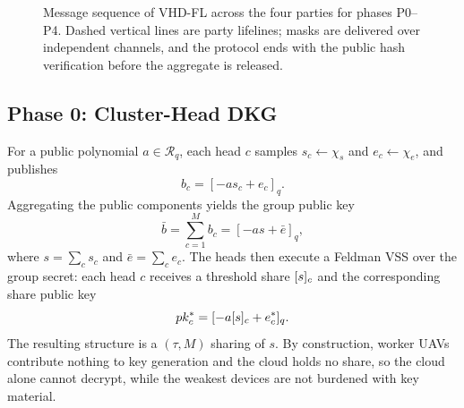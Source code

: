 \begin{figure}[t]
  \caption{Message sequence of \textsc{VHD-FL} across the four parties for phases P0--P4. Dashed vertical lines are party lifelines; masks are delivered over independent channels, and the protocol ends with the public hash verification before the aggregate is released.}
  \label{fig:sequence}
\end{figure}

\subsection{Phase 0: Cluster-Head DKG}
\label{subsec:phase0}
For a public polynomial $a\in\mathcal{R}_q$, each head $c$ samples $s_c\leftarrow\chi_s$ and $e_c\leftarrow\chi_e$, and publishes
\begin{equation}
  b_c=[-a s_c+e_c]_q .
\end{equation}
Aggregating the public components yields the group public key
\begin{equation}
  \label{eq:group-pk}
  \bar b=\sum_{c=1}^{M} b_c=[-a s+\bar e]_q ,
\end{equation}
where $s=\sum_c s_c$ and $\bar e=\sum_c e_c$. The heads then execute a Feldman VSS over the group secret: each head $c$ receives a threshold share $[s]_{c}$ and the corresponding share public key
\begin{equation}
  pk_c^*=[-a[s]_{c}+e_c^*]_q .
\end{equation}
The resulting structure is a $( \tau, M)$ sharing of $s$. By construction, worker UAVs contribute nothing to key generation and the cloud holds no share, so the cloud alone cannot decrypt, while the weakest devices are not burdened with key material.

